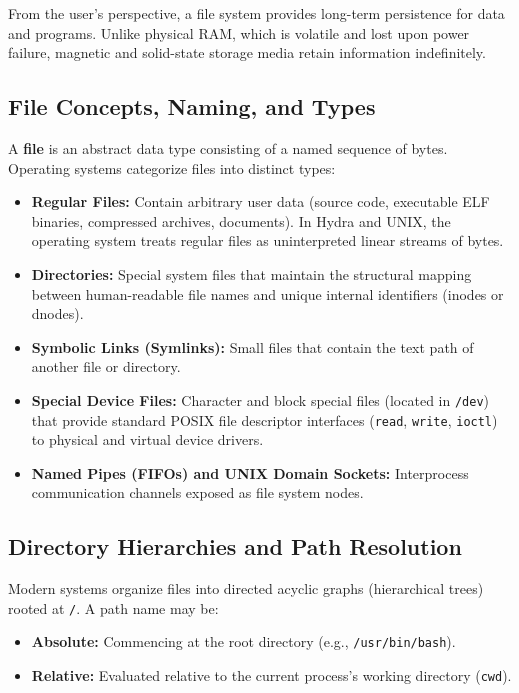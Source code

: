 From the user's perspective, a file system provides long-term persistence for data and programs. Unlike physical RAM, which is volatile and lost upon power failure, magnetic and solid-state storage media retain information indefinitely.

\subsection{File Concepts, Naming, and Types}
A \textbf{file} is an abstract data type consisting of a named sequence of bytes. Operating systems categorize files into distinct types:
\begin{itemize}
    \item \textbf{Regular Files:} Contain arbitrary user data (source code, executable ELF binaries, compressed archives, documents). In Hydra and UNIX, the operating system treats regular files as uninterpreted linear streams of bytes.
    \item \textbf{Directories:} Special system files that maintain the structural mapping between human-readable file names and unique internal identifiers (inodes or dnodes).
    \item \textbf{Symbolic Links (Symlinks):} Small files that contain the text path of another file or directory.
    \item \textbf{Special Device Files:} Character and block special files (located in \texttt{/dev}) that provide standard POSIX file descriptor interfaces (\texttt{read}, \texttt{write}, \texttt{ioctl}) to physical and virtual device drivers.
    \item \textbf{Named Pipes (FIFOs) and UNIX Domain Sockets:} Interprocess communication channels exposed as file system nodes.
\end{itemize}

\subsection{Directory Hierarchies and Path Resolution}
Modern systems organize files into directed acyclic graphs (hierarchical trees) rooted at \texttt{/}. A path name may be:
\begin{itemize}
    \item \textbf{Absolute:} Commencing at the root directory (e.g., \texttt{/usr/bin/bash}).
    \item \textbf{Relative:} Evaluated relative to the current process's working directory (\texttt{cwd}).
\end{itemize}

